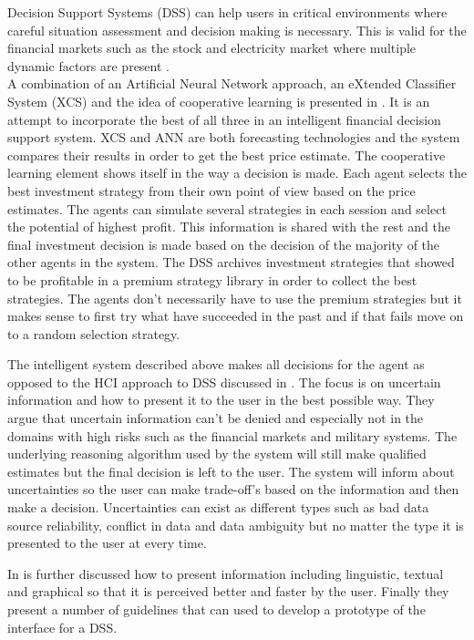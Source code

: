 Decision Support Systems (DSS) can help users in critical environments where careful situation assessment and decision making is necessary. This is valid for the financial markets such as the stock and electricity market where multiple dynamic factors are present \cite{UncertainInformation}.
\\[0.5cm]
A combination of an Artificial Neural Network approach, an eXtended Classifier System (XCS) and the idea of cooperative learning is presented in \cite{groupLearningDS}. It is an attempt to incorporate the best of all three in an intelligent financial decision support system. XCS and ANN are both forecasting technologies and the system compares their results in order to get the best price estimate. The cooperative learning element shows itself in the way a decision is made. Each agent selects the best investment strategy from their own point of view based on the price estimates. The agents can simulate several strategies in each session and select the potential of highest profit. This information is shared with the rest and the final investment decision is made based on the decision of the majority of the other agents in the system. The DSS archives investment strategies that showed to be profitable in a premium strategy library in order to collect the best strategies. The agents don't necessarily have to use the premium strategies but it makes sense to first try what have succeeded in the past and if that fails move on to a random selection strategy. 

The intelligent system described above makes all decisions for the agent as opposed to the HCI approach to DSS discussed in \cite{UncertainInformation}. The focus is on uncertain information and how to present it to the user in the best possible way. They argue that uncertain information can't be denied and especially not in the domains with high risks such as the financial markets and military systems. The underlying reasoning algorithm used by the system will still make qualified estimates but the final decision is left to the user. The system will inform about uncertainties so the user can make trade-off's based on the information and then make a decision. Uncertainties can exist as different types such as bad data source reliability, conflict in data and data ambiguity but no matter the type it is presented to the user at every time. 

In \cite{UncertainInformation} is further discussed how to present information including linguistic, textual and graphical so that it is perceived better and faster by the user. Finally they present a number of guidelines that can used to develop a prototype of the interface for a DSS.